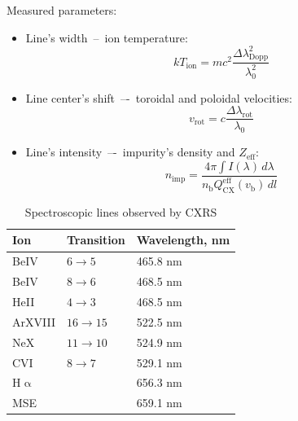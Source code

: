\documentclass[../main.tex]{subfiles}
\begin{document}
Measured parameters:
\begin{itemize}
    \item Line’s width~--~ion temperature:
          \begin{equation}
              \label{eq:ion_temperature}
              kT_\text{ion} = mc^2 \dfrac{{\Delta\lambda}_\text{Dopp}^2}{\lambda_{0}^{2}}
          \end{equation}

    \item Line center’s shift~–-~toroidal and poloidal velocities:
          \begin{equation}
              \label{eq:rotational_velocity}
              v_\text{rot} = c \dfrac{\Delta\lambda_\text{rot}}{\lambda_{0}}
          \end{equation}

    \item Line’s intensity~–-~impurity's density and $Z_\text{eff}$:
          \begin{equation}
              \label{eq:impurity_density}
              n_\text{imp} = \dfrac{4\pi \int I(\lambda)\, d\lambda}{n_\text{b} Q_\text{CX}^\text{eff}(v_\text{b})\, dl}
          \end{equation}

\end{itemize}

\begin{table}[ht]
    \centering
    \begin{tabular}[]{l l l}
        \toprule
        Ion         & Transition & Wavelength, nm \\
        \midrule
        BeIV        & $6\to5$    & 465.8 nm       \\
        BeIV        & $8\to6$    & 468.5 nm       \\
        HeII        & $4\to3$    & 468.5 nm       \\
        \midrule
        ArXVIII     & $16\to15$  & 522.5 nm       \\
        NeX         & $11\to10$  & 524.9 nm       \\
        CVI         & $8\to7$    & 529.1 nm       \\
        \midrule
        H$\upalpha$ &            & 656.3 nm       \\
        MSE         &            & 659.1 nm       \\
        \bottomrule
    \end{tabular}
    \caption{Spectroscopic lines observed by CXRS}%
    \label{tab:cxrs_lines}
\end{table}
\end{document}
